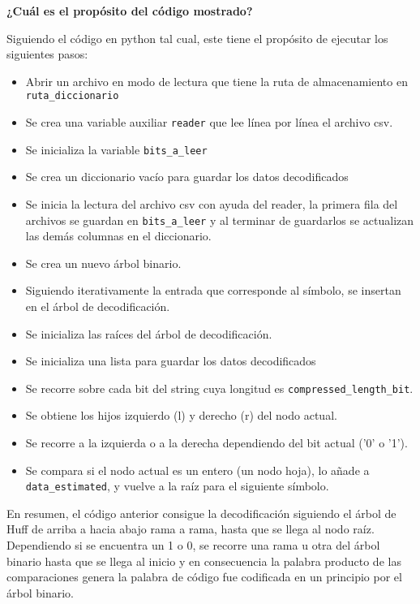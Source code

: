 \documentclass[conference,onecolumn,12pt]{IEEEtran}
\numberwithin{equation}{subsection}
\begin{document}
\textbf{¿Cuál es el propósito del código mostrado?}

Siguiendo el código en python tal cual, este tiene el propósito de ejecutar los siguientes pasos:

\begin{itemize}
\item Abrir un archivo en modo de lectura que tiene la ruta de almacenamiento en \texttt{ruta_diccionario}
\item Se crea una variable auxiliar \texttt{reader} que lee línea por línea el archivo csv.
\item Se inicializa la variable \texttt{bits_a_leer}
\item Se crea un diccionario vacío para guardar los datos decodificados
\item Se inicia la lectura del archivo csv con ayuda del reader, la primera fila del archivos se guardan en \texttt{bits_a_leer} y al terminar de guardarlos se actualizan las demás columnas en el diccionario.
\item Se crea un nuevo árbol binario.
\item Siguiendo iterativamente la entrada que corresponde al símbolo, se insertan en el árbol de decodificación.
\item Se inicializa las raíces del árbol de decodificación.
 \item Se inicializa una lista para guardar los datos decodificados
\item Se recorre sobre cada bit del string cuya longitud es \texttt{compressed_length_bit}.
\item Se obtiene los hijos izquierdo (l) y derecho (r) del nodo actual.
\item Se recorre a la izquierda o a la derecha dependiendo del bit actual ('0' o '1').
\item Se compara si el nodo actual es un entero (un nodo hoja), lo añade a \texttt{data_estimated}, y vuelve a la raíz para el siguiente símbolo.
\end{itemize}


En resumen, el código anterior consigue la decodificación siguiendo el árbol de Huff de arriba a hacia abajo rama a rama, hasta que se llega al nodo raíz. Dependiendo si se encuentra un 1 o 0, se recorre una rama u otra del árbol binario hasta que se llega al inicio y en consecuencia la palabra producto de las comparaciones genera la palabra de código fue codificada en un principio por el árbol binario.

\newpage
\end{document}
